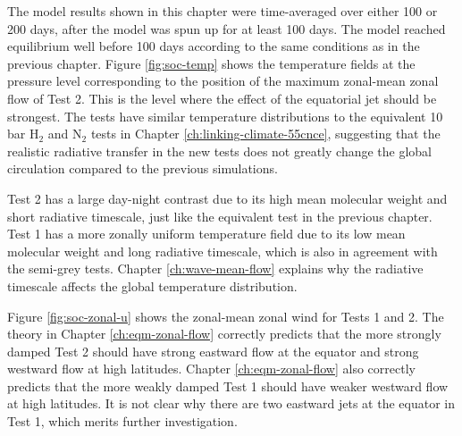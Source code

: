 The model results shown in this chapter were time-averaged over either 100 or 200 days, after the model was spun up for at least 100 days. The model reached equilibrium well before 100 days according to the same conditions as in the previous chapter. Figure \ref{fig:soc-temp} shows the temperature fields at the pressure level corresponding to the position of the maximum zonal-mean zonal flow of Test 2. This is the level where the effect of the equatorial jet should be strongest. The tests have similar temperature distributions to the equivalent 10 bar H$_{2}$ and N$_{2}$ tests in Chapter \ref{ch:linking-climate-55cnce}, suggesting that the realistic radiative transfer in the new tests does not greatly change the global circulation compared to the previous simulations.


Test 2 has a large day-night contrast due to its high mean molecular weight and short radiative timescale, just like the equivalent test in the previous chapter. Test 1 has a more zonally uniform temperature field due to its low mean molecular weight and long radiative timescale, which is also in agreement with the semi-grey tests. Chapter \ref{ch:wave-mean-flow} explains why the radiative timescale affects the global temperature distribution.


Figure \ref{fig:soc-zonal-u} shows the zonal-mean zonal wind for Tests 1 and 2. The theory in Chapter \ref{ch:eqm-zonal-flow} correctly predicts that the more strongly damped Test 2 should have strong eastward flow at the equator and strong westward flow at high latitudes. Chapter \ref{ch:eqm-zonal-flow} also correctly predicts that the more weakly damped Test 1 should have weaker westward flow at high latitudes. It is not clear why there are two eastward jets at the equator in Test 1, which merits further investigation.


